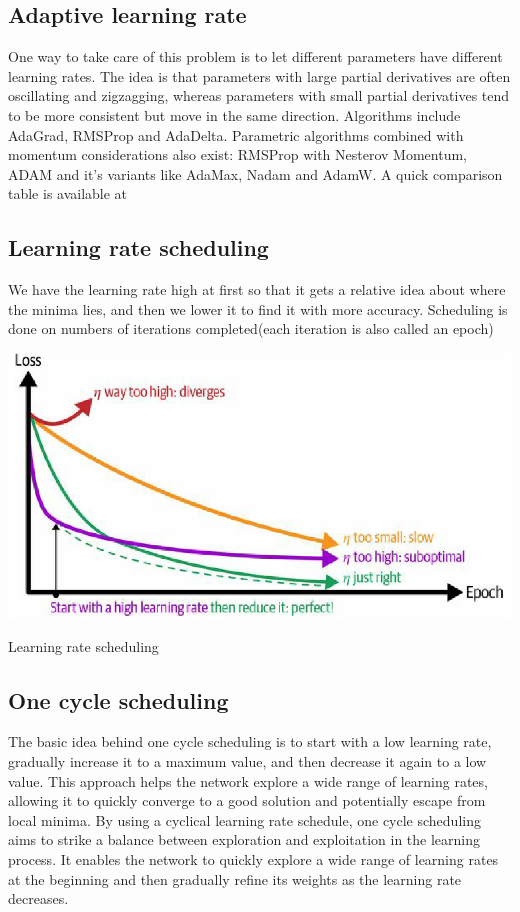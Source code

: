 \subsection{Adaptive learning rate}
One way to take care of this problem is  to let different parameters have different learning rates. The idea is that parameters with large partial derivatives are often oscillating
and zigzagging, whereas parameters with small partial derivatives tend to be
more consistent but move in the same direction.
Algorithms include AdaGrad, RMSProp and AdaDelta. Parametric algorithms
combined with momentum considerations also exist: RMSProp with Nesterov
Momentum, ADAM and it's variants like AdaMax, Nadam and AdamW. A quick
comparison table is available at \citep{geron2022hands}
\subsection{Learning rate scheduling}
We have the learning rate high at first so
that it gets a relative idea about where the
minima lies, and then we lower it to find it
with more accuracy. Scheduling is done on numbers of iterations
completed(each iteration is also called an
epoch)
\begin{marginfigure}
    \includegraphics[width=1.3\textwidth]{graphics/learning rate schedule.png}\caption{Learning rate scheduling\citep{geron2022hands}}
\end{marginfigure}
\subsection{One cycle scheduling}
The basic idea behind one cycle scheduling is to start with a low learning
rate, gradually increase it to a maximum value, and then decrease it again to
a low value. This approach helps the network explore a wide range of
learning rates, allowing it to quickly converge to a good solution and
potentially escape from local minima. By using a cyclical learning rate schedule, one cycle scheduling aims to strike
a balance between exploration and exploitation in the learning process. It
enables the network to quickly explore a wide range of learning rates at the
beginning and then gradually refine its weights as the learning rate
decreases.
